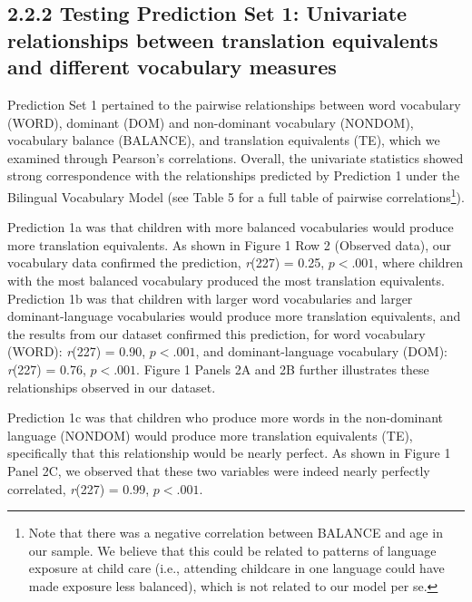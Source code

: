 \documentclass[
  english,
  ,man,floatsintext]{apa6}
\begin{document}
\hypertarget{testing-prediction-set-1-univariate-relationships-between-translation-equivalents-and-different-vocabulary-measures}{%
\subsection{2.2.2 Testing Prediction Set 1: Univariate relationships between translation equivalents and different vocabulary measures}\label{testing-prediction-set-1-univariate-relationships-between-translation-equivalents-and-different-vocabulary-measures}}

Prediction Set 1 pertained to the pairwise relationships between word vocabulary (WORD), dominant (DOM) and non-dominant vocabulary (NONDOM), vocabulary balance (BALANCE), and translation equivalents (TE), which we examined through Pearson's correlations. Overall, the univariate statistics showed strong correspondence with the relationships predicted by Prediction 1 under the Bilingual Vocabulary Model (see Table 5 for a full table of pairwise correlations\footnote{Note that there was a negative correlation between BALANCE and age in our sample. We believe that this could be related to patterns of language exposure at child care (i.e., attending childcare in one language could have made exposure less balanced), which is not related to our model per se.}).

Prediction 1a was that children with more balanced vocabularies would produce more translation equivalents. As shown in Figure 1 Row 2 (Observed data), our vocabulary data confirmed the prediction, \emph{r}(227) = 0.25, \(p < .001\), where children with the most balanced vocabulary produced the most translation equivalents. Prediction 1b was that children with larger word vocabularies and larger dominant-language vocabularies would produce more translation equivalents, and the results from our dataset confirmed this prediction, for word vocabulary (WORD): \emph{r}(227) = 0.90, \(p < .001\), and dominant-language vocabulary (DOM): \emph{r}(227) = 0.76, \(p < .001\). Figure 1 Panels 2A and 2B further illustrates these relationships observed in our dataset.

Prediction 1c was that children who produce more words in the non-dominant language (NONDOM) would produce more translation equivalents (TE), specifically that this relationship would be nearly perfect. As shown in Figure 1 Panel 2C, we observed that these two variables were indeed nearly perfectly correlated, \emph{r}(227) = 0.99, \(p < .001\).
\end{document}
